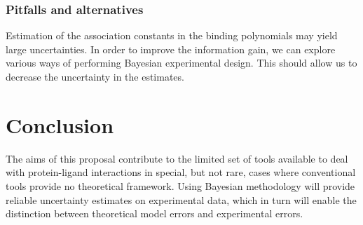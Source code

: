 \documentclass[10pt,final]{article}
\begin{document}
\subsubsection*{Pitfalls and alternatives}
Estimation of the association constants in the binding polynomials may yield large uncertainties.
%
In order to improve the information gain, we can explore various ways of performing Bayesian experimental design.
%
This should allow us to decrease the uncertainty in the estimates.

\section*{Conclusion}
The aims of this proposal contribute to the limited set of tools available to deal with protein-ligand interactions in special, but not rare, cases where conventional tools provide no theoretical framework. Using Bayesian methodology will provide reliable uncertainty estimates on experimental data, which in turn will enable the distinction between theoretical model errors and experimental errors.

\setlength{\emergencystretch}{1em}
\printbibliography
\end{document}
